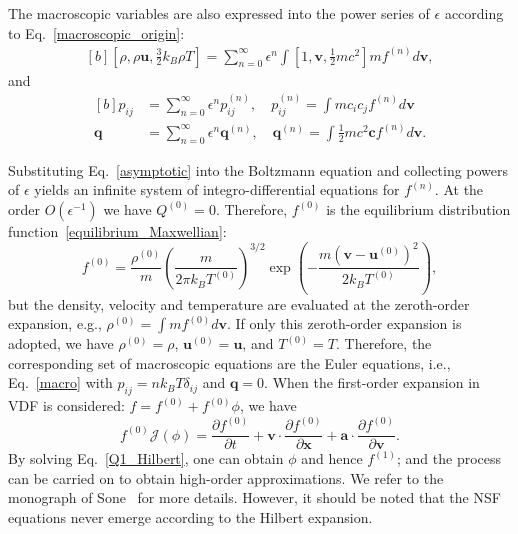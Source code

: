The macroscopic variables are also expressed into the power series of $\epsilon$ according to Eq.~\eqref{macroscopic_origin}:
\begin{equation}\label{conservative_hilbert}
\begin{aligned}[b]
\left[\rho,\rho\bm{u},\frac{3}{2}k_B\rho{}T\right]=\sum_{n=0}^\infty \epsilon^n \int \left[1,\bm{v}, \frac{1}{2}mc^2\right]mf^{(n)}d\bm{v},
\end{aligned}
\end{equation} 
and
\begin{equation}\label{shere_hilbert}
\begin{aligned}[b]
p_{ij} &=\sum_{n=0}^\infty \epsilon^n p_{ij}^{(n)},
\quad
p^{(n)}_{ij}=\int{}mc_ic_jf^{(n)}d\bm{v}
 \\  
 \bm{q} &=\sum_{n=0}^\infty \epsilon^n \bm{q}^{(n)}, 
 \quad
 \bm{q}^{(n)}=\int{}\frac{1}{2}mc^2\bm{c}f^{(n)}d\bm{v}.
 \end{aligned}
\end{equation}

Substituting Eq.~\eqref{asymptotic} into the Boltzmann equation and collecting powers of $\epsilon$ yields an infinite system of integro-differential equations for $f^{(n)}$. At the order $O(\epsilon^{-1})$ we have $Q^{(0)}=0$.
Therefore, $f^{(0)}$ is the equilibrium distribution function~\eqref{equilibrium_Maxwellian}:
\begin{equation}
f^{(0)}
=\frac{\rho^{(0)}}{m}\left(\frac{m}{2\pi   k_BT^{(0)}}\right)^{3/2}\exp\left(-\frac{m(\bm{v}-\bm{u}^{(0)})^2}{2k_BT^{(0)}}\right),
\end{equation}
but the density, velocity and temperature are evaluated at the zeroth-order expansion, e.g., $\rho^{(0)}=\int {mf^{(0)}d\bm{v}}$. 
If only this zeroth-order expansion is adopted, we have  $\rho^{(0)}=\rho$, $\bm{u}^{(0)}=\bm{u}$, and $T^{(0)}=T$. Therefore, the corresponding set of macroscopic equations are the Euler equations, i.e., Eq.~\eqref{macro} with
$p_{ij}=nk_BT\delta_{ij}$ and $\bm{q}=0$. When the first-order expansion in VDF is considered: $f=f^{(0)}+f^{(0)}\phi$, we have 
\begin{equation}\label{Q1_Hilbert}
f^{(0)}\mathcal{J}(\phi)= 
\frac{\partial f^{(0)}}{\partial t}+\bm{v}\cdot\frac{\partial f^{(0)}}{\partial
	\bm{x}}+\bm{a}\cdot\frac{\partial f^{(0)}}{\partial \bm{v}}.
\end{equation}
By solving Eq.~\eqref{Q1_Hilbert}, one can obtain $\phi$ and hence $f^{(1)}$; and the process can be carried on to obtain high-order approximations. We refer to the monograph of Sone~\cite{Sone2002Book} for more details. However, it should be noted that the NSF equations never emerge according to the Hilbert expansion.



